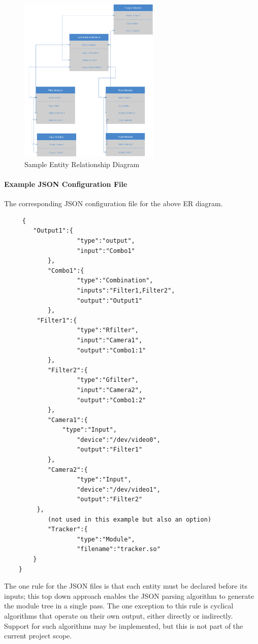 	\begin{figure}[H] 
		\centering
		\includegraphics[width=0.6\textwidth,natwidth=610,natheight=642]{images/ER_Diagram.png}
		\caption{Sample Entity Relationship Diagram}  
		\end{figure}
	
	\paragraph{Example JSON Configuration File}
	The corresponding JSON configuration file for the above ER diagram. \\
	
	 \begin{lstlisting}
	 {
   	 	"Output1":{
        			"type":"output",
        			"input":"Combo1"
    		},
    		"Combo1":{
        			"type":"Combination",
        			"inputs":"Filter1,Filter2",
        			"output":"Output1"
    		},
   		 "Filter1":{
        			"type":"Rfilter",
        			"input":"Camera1",
        			"output":"Combo1:1"
    		},
    		"Filter2":{
        			"type":"Gfilter",
        			"input":"Camera2",
        			"output":"Combo1:2"
    		},
    		"Camera1":{
       		 	"type":"Input",
        			"device":"/dev/video0",
        			"output":"Filter1"
    		},
    		"Camera2":{
        			"type":"Input",
        			"device":"/dev/video1",
        			"output":"Filter2"
   		 },
    		(not used in this example but also an option)
    		"Tracker":{
        			"type":"Module",
        			"filename":"tracker.so"
   	 	}
	}
	 \end{lstlisting}
	
	The one rule for the JSON files is that each entity must be declared before its inputs; this top down approach enables the JSON parsing algorithm to generate the module tree in a single pass. The one exception to this rule is cyclical algorithms that operate on their own output, either directly or indirectly. Support for such algorithms may be implemented, but this is not part of the current project scope. 
	
